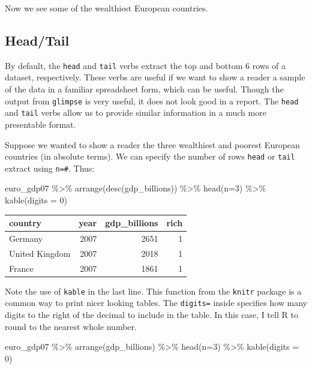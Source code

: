 \documentclass[
]{book}
\makeatletter
\newenvironment{Shaded}{\begin{snugshade}}{\end{snugshade}}
\newcommand{\AttributeTok}[1]{\textcolor[rgb]{0.61,0.61,0.61}{#1}}
\newcommand{\DecValTok}[1]{\textcolor[rgb]{0.06,0.06,0.06}{#1}}
\newcommand{\FunctionTok}[1]{\textcolor[rgb]{0,0,0}{#1}}
\newcommand{\NormalTok}[1]{#1}
\newcommand{\SpecialCharTok}[1]{\textcolor[rgb]{0,0,0}{#1}}
\newenvironment{kframe}{%
\medskip{}
\setlength{\fboxsep}{.8em}
 \def\at@end@of@kframe{}%
 \ifinner\ifhmode%
  \def\at@end@of@kframe{\end{minipage}}%
  \begin{minipage}{\columnwidth}%
 \fi\fi%
 \def\FrameCommand##1{\hskip\@totalleftmargin \hskip-\fboxsep
 \colorbox{shadecolor}{##1}\hskip-\fboxsep
     \hskip-\linewidth \hskip-\@totalleftmargin \hskip\columnwidth}%
 \MakeFramed {\advance\hsize-\width
   \@totalleftmargin\z@ \linewidth\hsize
   \@setminipage}}%
 {\par\unskip\endMakeFramed%
 \at@end@of@kframe}
\renewenvironment{Shaded}{\begin{kframe}}{\end{kframe}}
\makeatother
\begin{document}
Now we see some of the wealthiest European countries.

\hypertarget{headtail}{%
\subsection{Head/Tail}\label{headtail}}

By default, the \texttt{head} and \texttt{tail} verbs extract the top and bottom 6 rows of a dataset, respectively. These verbs are useful if we want to show a reader a sample of the data in a familiar spreadsheet form, which can be useful. Though the output from \texttt{glimpse} is very useful, it does not look good in a report. The \texttt{head} and \texttt{tail} verbs allow us to provide similar information in a much more presentable format.

Suppose we wanted to show a reader the three wealthiest and poorest European countries (in absolute terms). We can specify the number of rows \texttt{head} or \texttt{tail} extract using \texttt{n=\#}. Thus:

\begin{Shaded}
\begin{Highlighting}[]
\NormalTok{euro\_gdp07 }\SpecialCharTok{\%\textgreater{}\%} 
  \FunctionTok{arrange}\NormalTok{(}\FunctionTok{desc}\NormalTok{(gdp\_billions)) }\SpecialCharTok{\%\textgreater{}\%} 
  \FunctionTok{head}\NormalTok{(}\AttributeTok{n=}\DecValTok{3}\NormalTok{) }\SpecialCharTok{\%\textgreater{}\%} 
  \FunctionTok{kable}\NormalTok{(}\AttributeTok{digits =} \DecValTok{0}\NormalTok{)}
\end{Highlighting}
\end{Shaded}

\begin{tabular}{l|r|r|r}
\hline
country & year & gdp\_billions & rich\\
\hline
Germany & 2007 & 2651 & 1\\
\hline
United Kingdom & 2007 & 2018 & 1\\
\hline
France & 2007 & 1861 & 1\\
\hline
\end{tabular}

Note the use of \texttt{kable} in the last line. This function from the \texttt{knitr} package is a common way to print nicer looking tables. The \texttt{digits=} inside specifies how many digits to the right of the decimal to include in the table. In this case, I tell R to round to the nearest whole number.

\begin{Shaded}
\begin{Highlighting}[]
\NormalTok{euro\_gdp07 }\SpecialCharTok{\%\textgreater{}\%} 
  \FunctionTok{arrange}\NormalTok{(gdp\_billions) }\SpecialCharTok{\%\textgreater{}\%} 
  \FunctionTok{head}\NormalTok{(}\AttributeTok{n=}\DecValTok{3}\NormalTok{) }\SpecialCharTok{\%\textgreater{}\%} 
  \FunctionTok{kable}\NormalTok{(}\AttributeTok{digits =} \DecValTok{0}\NormalTok{)}
\end{Highlighting}
\end{Shaded}
\end{document}

